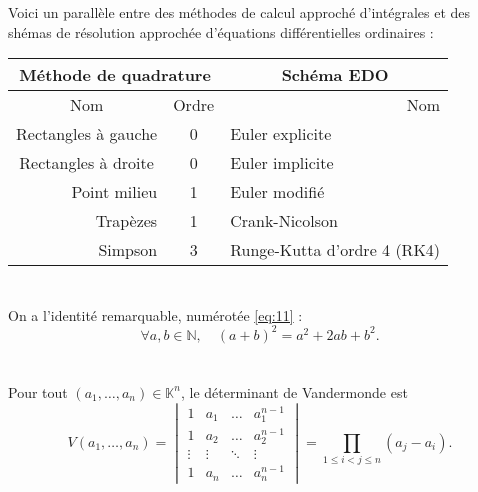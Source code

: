 \documentclass[conference]{IEEEtran}
\begin{document}
\section{}
\noindent
Voici un parallèle entre des méthodes de calcul approché d'intégrales et des shémas de résolution approchée d'équations différentielles ordinaires :
\newline

\begin{tabular}{|c|c|c|}
    \hline
    \multicolumn{2}{|c||}{Méthode de quadrature} & Schéma EDO \\
    \hline
    \multicolumn{1}{|c|}{Nom} & \multicolumn{1}{c||}{Ordre} & \multicolumn{1}{r|}{Nom} \\
    \hline
    Rectangles à gauche & \multicolumn{1}{c||}{0}  & \multicolumn{1}{l|}{Euler explicite} \\
    \hline
    Rectangles à droite & \multicolumn{1}{c||}{0} & \multicolumn{1}{l|}{Euler implicite} \\
    \hline
    \multicolumn{1}{|r|}{Point milieu} & \multicolumn{1}{c||}{1} & \multicolumn{1}{l|}{Euler modifié} \\
    \hline
    \multicolumn{1}{|r|}{Trapèzes} & \multicolumn{1}{c||}{1} & \multicolumn{1}{l|}{Crank-Nicolson}\\
    \hline
    \multicolumn{1}{|r|}{Simpson} & \multicolumn{1}{c||}{3} & \multicolumn{1}{l|}{Runge-Kutta d'ordre 4 (RK4)}\\
    \hline
\end{tabular}

\section{}
\noindent

On a l'identité remarquable, numérotée \eqref{eq:11} :
\begin{equation}
\forall a,b\in \mathbb{N},\quad(a+b)^2=a^2+2ab+b^2.
\label{eq:11}
\end{equation}

\section{}
\noindent
Pour tout $(a_1,\ldots,a_n)\in\mathbb{K}^n$, le déterminant de Vandermonde est
\[V(a_1,\ldots,a_n)= \begin{vmatrix} 
1 & a_1 & \ldots & a_1^{n-1} \\
1 & a_2 & \ldots & a_2^{n-1} \\
\vdots & \vdots & \ddots & \vdots \\
1 & a_n & \ldots & a_n^{n-1}
\end{vmatrix} = \prod_{1\leq i <j\leq n}(a_j - a_i).\]
\end{document}
